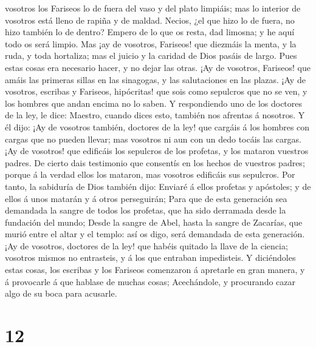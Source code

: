 vosotros los Fariseos lo de fuera del vaso y del plato limpiáis; mas lo
interior de vosotros está lleno de rapiña y de maldad. 
Necios, ¿el que hizo lo de fuera, no hizo también lo de dentro?
 Empero de lo que os resta, dad limosna; y he aquí todo os
será limpio.  Mas ¡ay de vosotros, Fariseos! que diezmáis
la menta, y la ruda, y toda hortaliza; mas el juicio y la caridad de
Dios pasáis de largo. Pues estas cosas era necesario hacer, y no dejar
las otras.  ¡Ay de vosotros, Fariseos! que amáis las
primeras sillas en las sinagogas, y las salutaciones en las plazas.
 ¡Ay de vosotros, escribas y Fariseos, hipócritas! que sois
como sepulcros que no se ven, y los hombres que andan encima no lo
saben.  Y respondiendo uno de los doctores de la ley, le
dice: Maestro, cuando dices esto, también nos afrentas á nosotros.
 Y él dijo: ¡Ay de vosotros también, doctores de la ley!
que cargáis á los hombres con cargas que no pueden llevar; mas vosotros
ni aun con un dedo tocáis las cargas.  ¡Ay de vosotros! que
edificáis los sepulcros de los profetas, y los mataron vuestros padres.
 De cierto dais testimonio que consentís en los hechos de
vuestros padres; porque á la verdad ellos los mataron, mas vosotros
edificáis sus sepulcros.  Por tanto, la sabiduría de Dios
también dijo: Enviaré á ellos profetas y apóstoles; y de ellos á unos
matarán y á otros perseguirán;  Para que de esta generación
sea demandada la sangre de todos los profetas, que ha sido derramada
desde la fundación del mundo;  Desde la sangre de Abel,
hasta la sangre de Zacarías, que murió entre el altar y el templo: así
os digo, será demandada de esta generación.  ¡Ay de
vosotros, doctores de la ley! que habéis quitado la llave de la ciencia;
vosotros mismos no entrasteis, y á los que entraban impedisteis.
 Y diciéndoles estas cosas, los escribas y los Fariseos
comenzaron á apretarle en gran manera, y á provocarle á que hablase de
muchas cosas;  Acechándole, y procurando cazar algo de su
boca para acusarle.

\hypertarget{section-11}{%
\section{12}\label{section-11}}

